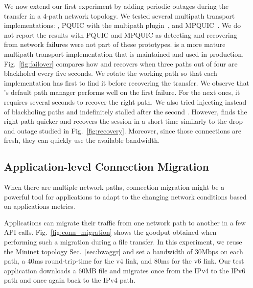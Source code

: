 We now extend our first experiment by adding periodic outages during the 
transfer in a 4-path network topology.
We tested several multipath transport implementations: \mptcp, PQUIC with the 
multipath
plugin~\cite{de2019pluginizing}, and MPQUIC~\cite{de2017multipath}.
We do not report the results with PQUIC and MPQUIC as 
detecting and recovering from network failures were not part of these 
prototypes.
\mptcp is a more mature multipath transport implementation that is maintained 
and used in production. Fig.~\ref{fig:failover} compares how 
\mptcp and \tcpls recovers when three paths out of four are blackholed every 
five seconds. We rotate the working path so that each implementation has 
first to find it before recovering the transfer. 
We observe that \mptcp's default path manager performs well on the first
failure. For the next ones, it requires several seconds to recover the right 
path. 
We also tried injecting \tcp \rst instead of blackholing paths and \mptcp 
indefinitely stalled after the second \rst.
However, \tcpls finds the right path quicker and recovers the session in a 
short time similarly to the drop and \rst outage studied in 
Fig.~\ref{fig:recovery}. Moreover, since those connections are fresh, they can 
quickly use the available bandwidth.

\subsection{Application-level Connection Migration}
\label{sec:app-migration}

When there are multiple network paths, connection migration might be a
powerful tool for applications to adapt to the changing network conditions 
based on applications metrics.

Applications can migrate their traffic from 
one network path to another in a few \tcpls API calls. 
Fig.~\ref{fig:conn_migration} shows the goodput 
obtained when performing such a migration during a file transfer.%
In this experiment, we reuse the Mininet topology%
Sec.~\ref{sec:bwaggr}%
and set a bandwidth of 30Mbps on each path, a 40ms 
round-trip-time for the v4 link, and 80ms for the v6 link. Our test application 
downloads a 60MB file and migrates once from the IPv4 to 
the IPv6 path and once again back to the IPv4 path.

